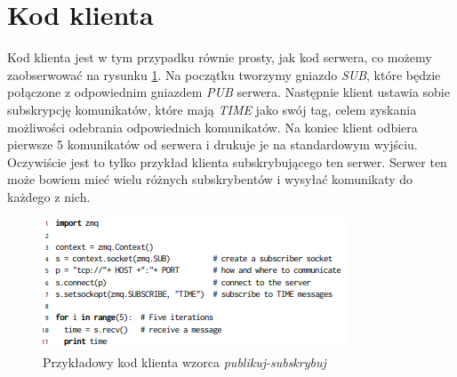\documentclass[10pt, a4paper]{article}
\begin{document}
\section*{Kod klienta}
Kod klienta jest w tym przypadku równie prosty, jak kod serwera, co możemy zaobserwować na rysunku \ref{fig:mesh2}. Na początku tworzymy gniazdo \textit{SUB}, które będzie połączone z odpowiednim gniazdem \textit{PUB} serwera. Następnie klient ustawia sobie subskrypcję komunikatów, które mają \textit{TIME} jako swój tag, celem zyskania możliwości odebrania odpowiednich komunikatów. Na koniec klient odbiera pierwsze 5 komunikatów od serwera i drukuje je na standardowym wyjściu. Oczywiście jest to tylko przykład klienta subskrybującego ten serwer. Serwer ten może bowiem mieć wielu różnych subskrybentów i wysyłać komunikaty do każdego z nich.
\begin{figure}[H]
\includegraphics{ps_client}
\caption{Przykładowy kod klienta wzorca \textit{publikuj-subskrybuj}}
\label{fig:mesh2}
\end{figure}
\end{document}
